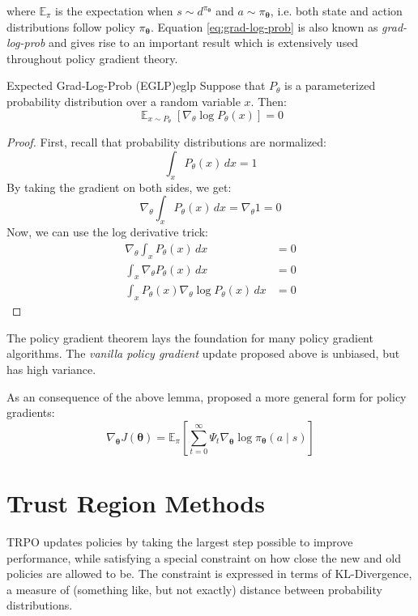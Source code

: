 where $\mathbb{E}_\pi$ is the expectation when $s \sim d^{\pi_{\boldsymbol\theta}}$ and $a \sim \pi_{\boldsymbol\theta}$, i.e. both state and action distributions follow policy $\pi_{\boldsymbol\theta}$. Equation \ref{eq:grad-log-prob} is also known as \textit{grad-log-prob} and gives rise to an important result which is extensively used throughout policy gradient theory.
\begin{lemma}{Expected Grad-Log-Prob (EGLP)}{eglp}
    Suppose that $P_\theta$ is a parameterized probability distribution over a random variable $x$. Then:
    \begin{equation}
        \mathop{\mathbb{E}}_{x \sim P_\theta}\left[\nabla_\theta \log{P_\theta(x)}\right] = 0
    \end{equation}
\end{lemma}
\begin{proof}
    First, recall that probability distributions are normalized:
    \begin{equation}
        \int_x P_\theta(x) \,dx = 1
    \end{equation}
    By taking the gradient on both sides, we get:
    \begin{equation}
        \nabla_\theta\int_x P_\theta(x) \,dx = \nabla_\theta 1 = 0
    \end{equation}
    Now, we can use the log derivative trick:
    \begin{align}
        \nabla_\theta\int_x P_\theta(x) \,dx &= 0 \nonumber\\
        \int_x \nabla_\theta P_\theta(x) \,dx &= 0 \\
        \int_x P_\theta(x) \nabla_\theta\log{P_\theta(x)} \,dx &= 0 \nonumber
    \end{align}
\end{proof}

The policy gradient theorem lays the foundation for many policy gradient algorithms. The \textit{vanilla policy gradient} update proposed above is unbiased, but has high variance.

As an consequence of the above lemma, \cite{https://doi.org/10.48550/arxiv.1506.02438} proposed a more general form for policy gradients:
\begin{equation}
    \nabla_{\boldsymbol\theta} J(\boldsymbol\theta) = \mathbb{E}_\pi\left[\sum_{t=0}^\infty\Psi_t\nabla_{\boldsymbol\theta}\log{\pi_{\boldsymbol\theta}(a \mid s)}\right]
\end{equation}

\section{Trust Region Methods}
TRPO updates policies by taking the largest step possible to improve performance, while satisfying a special constraint on how close the new and old policies are allowed to be. The constraint is expressed in terms of KL-Divergence, a measure of (something like, but not exactly) distance between probability distributions.

